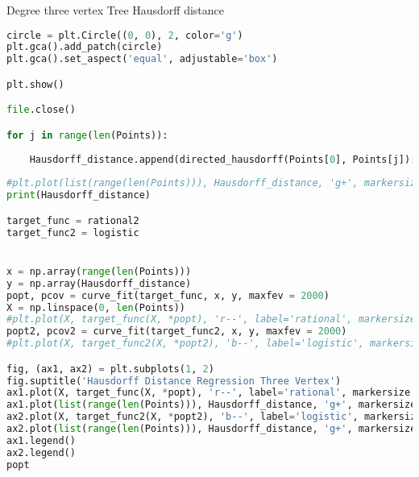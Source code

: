 \documentclass{article}
\begin{document}
\begin{codeblock}{Degree three vertex Tree Hausdorff distance}
\begin{lstlisting}[language=Python]
circle = plt.Circle((0, 0), 2, color='g')
plt.gca().add_patch(circle)
plt.gca().set_aspect('equal', adjustable='box')

plt.show()

file.close()

for j in range(len(Points)):
    
    Hausdorff_distance.append(directed_hausdorff(Points[0], Points[j])[0])
    
#plt.plot(list(range(len(Points))), Hausdorff_distance, 'g+', markersize = 10)
print(Hausdorff_distance)

target_func = rational2
target_func2 = logistic


x = np.array(range(len(Points)))
y = np.array(Hausdorff_distance)
popt, pcov = curve_fit(target_func, x, y, maxfev = 2000)
X = np.linspace(0, len(Points))
#plt.plot(X, target_func(X, *popt), 'r--', label='rational', markersize = 1)
popt2, pcov2 = curve_fit(target_func2, x, y, maxfev = 2000)
#plt.plot(X, target_func2(X, *popt2), 'b--', label='logistic', markersize = 1)

fig, (ax1, ax2) = plt.subplots(1, 2)
fig.suptitle('Hausdorff Distance Regression Three Vertex')
ax1.plot(X, target_func(X, *popt), 'r--', label='rational', markersize = 1)
ax1.plot(list(range(len(Points))), Hausdorff_distance, 'g+', markersize = 10)
ax2.plot(X, target_func2(X, *popt2), 'b--', label='logistic', markersize = 1)
ax2.plot(list(range(len(Points))), Hausdorff_distance, 'g+', markersize = 10)
ax1.legend()
ax2.legend()
popt
\end{lstlisting}
    
\end{codeblock}
\end{document}
